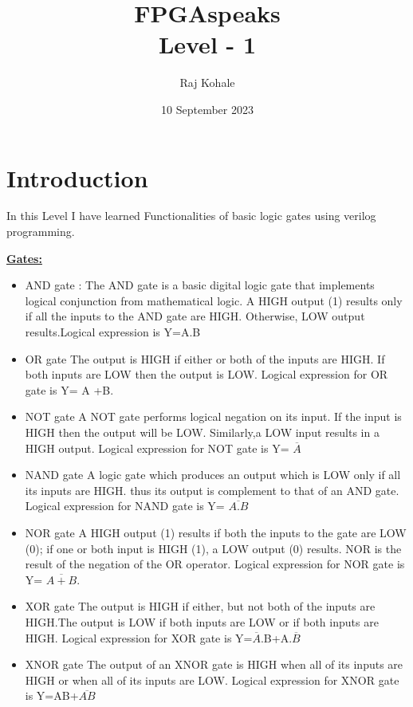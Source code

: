 \documentclass{article}
\title{\textbf{ FPGAspeaks \\Level - 1}}
\author{Raj Kohale}
\date{10 September 2023}
\begin{document}
\maketitle

\section{ Introduction } 
 In this Level I have learned Functionalities of basic logic gates using verilog programming.
 
 \textbf{ \underline{Gates:}}
 \begin{itemize}

 

\item  AND gate :  
\newline The AND gate is a basic digital logic gate that implements logical conjunction from mathematical logic. A HIGH output (1) results only if all the inputs to the AND gate are HIGH. Otherwise, LOW output results.Logical expression is Y=A.B
\item  OR gate
\newline The output is HIGH if either or both of the inputs are HIGH. If both inputs are LOW then the output is LOW. Logical expression for OR gate is Y= A
+B.

\item  NOT gate
\newline A NOT gate performs logical negation on its input. If the input is HIGH then the output will be LOW. Similarly,a LOW input results in a HIGH output. Logical expression for NOT gate is Y= $\overline{ A }$

\item  NAND gate
\newline A logic gate which produces an output which is LOW only if all its inputs are HIGH. thus its output is complement to that of an AND gate.  Logical expression for NAND gate is Y=  $\overline {A.B} $

\item  NOR gate
\newline  A HIGH output (1) results if both the inputs to the gate are LOW (0); if one or both input is HIGH (1), a LOW output (0) results. NOR is the result of the negation of the OR operator. Logical expression for NOR gate is Y=  $\overline {A+B}.$

\item  XOR gate
\newline The output is HIGH if either, but not both of the inputs are HIGH.The output is LOW if both inputs are LOW or if both inputs are HIGH. Logical expression for XOR gate is Y=$\overline{A}$.B+A.$\overline{B}$

\item  XNOR gate
\newline The output of an XNOR gate is HIGH when all of its inputs are HIGH or when all of its inputs are LOW. Logical expression for XNOR gate is Y=AB+$\overline{AB}$



 \end{itemize}
\end{document}
